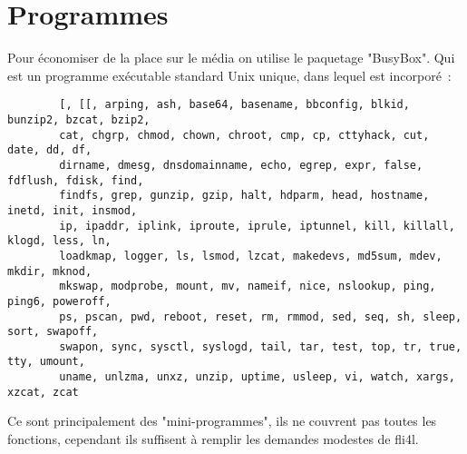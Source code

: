

    \section{Programmes}

    Pour économiser de la place sur le média on utilise le paquetage
    "BusyBox". Qui est un programme exécutable standard Unix unique,
    dans lequel est incorporé~:

\begin{example}
\begin{verbatim}
        [, [[, arping, ash, base64, basename, bbconfig, blkid, bunzip2, bzcat, bzip2,
        cat, chgrp, chmod, chown, chroot, cmp, cp, cttyhack, cut, date, dd, df,
        dirname, dmesg, dnsdomainname, echo, egrep, expr, false, fdflush, fdisk, find,
        findfs, grep, gunzip, gzip, halt, hdparm, head, hostname, inetd, init, insmod,
        ip, ipaddr, iplink, iproute, iprule, iptunnel, kill, killall, klogd, less, ln,
        loadkmap, logger, ls, lsmod, lzcat, makedevs, md5sum, mdev, mkdir, mknod,
        mkswap, modprobe, mount, mv, nameif, nice, nslookup, ping, ping6, poweroff,
        ps, pscan, pwd, reboot, reset, rm, rmmod, sed, seq, sh, sleep, sort, swapoff,
        swapon, sync, sysctl, syslogd, tail, tar, test, top, tr, true, tty, umount,
        uname, unlzma, unxz, unzip, uptime, usleep, vi, watch, xargs, xzcat, zcat
\end{verbatim}
\end{example}

    \noindent Ce sont principalement des "mini-programmes", ils ne couvrent
    pas toutes les fonctions, cependant ils suffisent à remplir les demandes
    modestes de fli4l.

